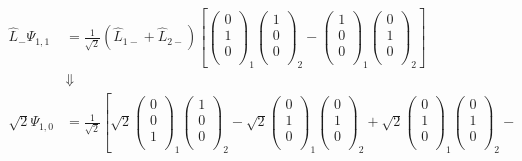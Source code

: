 \documentclass[11pt]{article}
\numberwithin{equation}{section}
\begin{document}
\begin{align*}
\hat{L}_{-}\Psi_{1,1} &= \frac{1}{\sqrt{2}}(\hat{L}_{1-}+\hat{L}_{2-})\left[\left(\begin{array}{c} 0\\ 1\\ 0\\\end{array}\right)_{1}\left(\begin{array}{c} 1\\ 0\\ 0\\\end{array}\right)_{2} -
\left(\begin{array}{c} 1\\ 0\\ 0\\\end{array}\right)_{1}\left(\begin{array}{c} 0\\ 1\\ 0\\\end{array}\right)_{2}\right]\\
&\Downarrow\\
\sqrt{2}\Psi_{1,0} &= \frac{1}{\sqrt{2}}
\left[\sqrt{2}\left(\begin{array}{c} 0\\ 0\\ 1\\\end{array}\right)_{1}\left(\begin{array}{c} 1\\ 0\\ 0\\\end{array}\right)_{2} -
\sqrt{2}\left(\begin{array}{c} 0\\ 1\\ 0\\\end{array}\right)_{1}\left(\begin{array}{c} 0\\ 1\\ 0\\\end{array}\right)_{2}\right. + 
\left.\sqrt{2}\left(\begin{array}{c} 0\\ 1\\ 0\\\end{array}\right)_{1}\left(\begin{array}{c} 0\\ 1\\ 0\\\end{array}\right)_{2} -

\end{align*}
\end{document}
